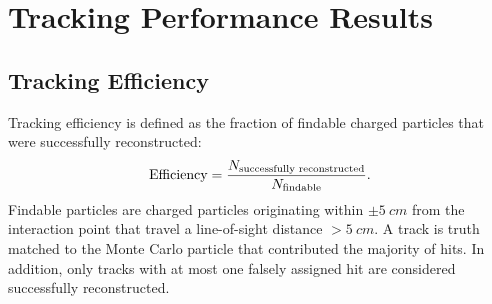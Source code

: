 \section{Tracking Performance Results}
\subsection{Tracking Efficiency}
Tracking efficiency is defined as the fraction of findable charged particles that were successfully reconstructed:
\begin{equation}
\mbox{Efficiency}=\frac{N_{\mbox{\scriptsize{successfully reconstructed}}}}{N_{\mbox{\scriptsize{findable}}}}.
\label{eq:eff}
\end{equation}
Findable particles are charged particles originating within $\pm5~cm$ from the interaction point that travel a line-of-sight distance $>5~cm$.
A track is truth matched to the Monte Carlo particle that contributed the majority of hits.
In addition, only tracks with at most one falsely assigned hit are considered successfully reconstructed.

